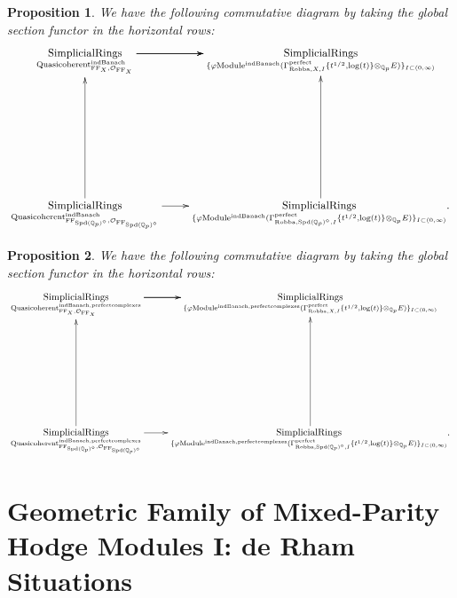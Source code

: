 \documentclass[12pt]{book}
\newtheorem{proposition}{Proposition}
\theoremstyle{definition}
\begin{document}
\begin{proposition}
We have the following commutative diagram by taking the global section functor in the horizontal rows:
\[\displayindent=+0in
\xymatrix@R+7pc{
\underset{\mathrm{Quasicoherent}^{\mathrm{indBanach}}_{\mathrm{FF}_X,\mathcal{O}_{\mathrm{FF}_X}}}{\mathrm{SimplicialRings}}  \ar[r] \ar[r] \ar[r] &\underset{\{\varphi\mathrm{Module}^{\mathrm{indBanach}}(\Gamma^\text{perfect}_{\text{Robba},X,I}\{t^{1/2},\log(t)\}\otimes_{\mathbb{Q}_p}E)\}_{I\subset (0,\infty)}}{\mathrm{SimplicialRings}}   \\
\underset{\mathrm{Quasicoherent}^{\mathrm{indBanach}}_{\mathrm{FF}_{\mathrm{Spd}(\mathbb{Q}_p)^\diamond},\mathcal{O}_{\mathrm{FF}_{\mathrm{Spd}(\mathbb{Q}_p)^\diamond}}}}{\mathrm{SimplicialRings}} \ar[u]\ar[r] &\underset{\{\varphi\mathrm{Module}^\text{indBanach}(\Gamma^\text{perfect}_{\text{Robba},{\mathrm{Spd}(\mathbb{Q}_p)^\diamond},I}\{t^{1/2},\log(t)\}\otimes_{\mathbb{Q}_p}E)\}_{I\subset (0,\infty)}}{\mathrm{SimplicialRings}}.\ar[u]  
}
\]
\end{proposition}

\begin{proposition}
We have the following commutative diagram by taking the global section functor in the horizontal rows:
\[\displayindent=+0in
\xymatrix@C+0in@R+7pc{
\underset{\mathrm{Quasicoherent}^{\mathrm{indBanach,perfectcomplexes}}_{\mathrm{FF}_X,\mathcal{O}_{\mathrm{FF}_X}}}{\mathrm{SimplicialRings}}  \ar[r] \ar[r] \ar[r] &\underset{\{\varphi\mathrm{Module}^{\mathrm{indBanach,perfectcomplexes}}(\Gamma^\text{perfect}_{\text{Robba},X,I}\{t^{1/2},\log(t)\}\otimes_{\mathbb{Q}_p}E)\}_{I\subset (0,\infty)}}{\mathrm{SimplicialRings}}   \\
\underset{\mathrm{Quasicoherent}^{\mathrm{indBanach,perfectcomplexes}}_{\mathrm{FF}_{\mathrm{Spd}(\mathbb{Q}_p)^\diamond},\mathcal{O}_{\mathrm{FF}_{\mathrm{Spd}(\mathbb{Q}_p)^\diamond}}}}{\mathrm{SimplicialRings}} \ar[u]\ar[r] &\underset{\{\varphi\mathrm{Module}^{\mathrm{indBanach,perfectcomplexes}}(\Gamma^\text{perfect}_{\text{Robba},{\mathrm{Spd}(\mathbb{Q}_p)^\diamond},I}\{t^{1/2},\log(t)\}\otimes_{\mathbb{Q}_p}E)\}_{I\subset (0,\infty)}}{\mathrm{SimplicialRings}}.\ar[u]  
}
\]

\end{proposition}






\newpage
\section{Geometric Family of Mixed-Parity Hodge Modules I: de Rham Situations}
\end{document}
